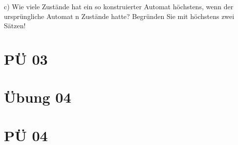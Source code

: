 \documentclass[paper=a4, fontsize=11pt]{scrartcl}
\numberwithin{equation}{section}
\numberwithin{figure}{section}
\numberwithin{table}{section}
\begin{document}
c) Wie viele Zustände hat ein so konstruierter Automat höchstens, wenn der ursprüngliche Automat n Zustände hatte? Begründen Sie mit höchstens zwei Sätzen! \\


\newpage

\section{PÜ 03}


\newpage

\section{Übung 04}


\newpage

\section{PÜ 04}

\end{document}
